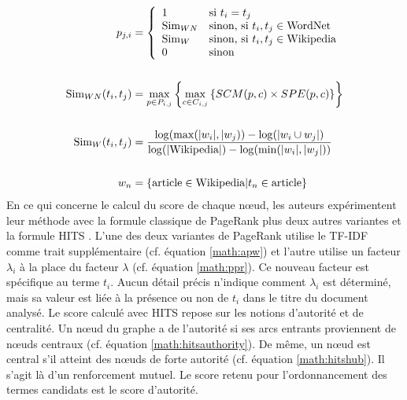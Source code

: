         \begin{align}
          p_{j, i} &= \left\{\begin{array}{ll}
            1 & \text{si $t_i = t_j$}\\
            \text{Sim}_{WN} & \text{sinon, si $t_i, t_j \in \text{WordNet}$}\\
             \text{Sim}_{W} &  \text{sinon, si $t_i, t_j \in \text{Wikipedia}$}\\
            0 & \text{sinon}
          \end{array}\right. \label{math:semanticrank}\\
          \notag\\
          \text{Sim}_{WN}(t_i, t_j) &= \max_{p \in P_{i, j}}\left\{\max_{c \in C_{i, j}}\left\{SCM(p, c) \times SPE(p, c)\right\}\right\} \label{math:wordnetsemanticrelatedness}\\
          \notag\\
          \text{Sim}_{W}(t_i, t_j) &= \frac{\log(\max(|w_i|, |w_j)) - \log(|w_i \cup w_j|)}{\log(|\text{Wikipedia}|) - \log(\min(|w_i|, |w_j|))} \label{math:wikipediasemanticrelatedness}\\
          \notag\\
          w_n &= \left\{\text{article} \in \text{Wikipedia} | t_n \in \text{article}\right\} \notag
        \end{align}
        En ce qui concerne le calcul du score de chaque n\oe{}ud, les auteurs
        expérimentent leur méthode avec la formule classique de PageRank
        \citep{brin1998pagerank} plus deux autres variantes et la formule HITS
        \citep{kleinberg1999hits}. L'une des deux variantes de PageRank utilise le
        TF-IDF comme trait supplémentaire (cf. équation \ref{math:apw}) et l'autre
        utilise un facteur $\lambda_i$ à la place du facteur $\lambda$ (cf.
        équation \ref{math:ppr}). Ce nouveau facteur est spécifique au terme
        $t_i$. Aucun détail précis n'indique comment $\lambda_i$ est déterminé,
        mais sa valeur est liée à la présence ou non de $t_i$ dans le titre du
        document analysé. Le score calculé avec HITS repose sur les notions
        d'autorité et de centralité. Un n\oe{}ud du graphe a de l'autorité si ses
        arcs entrants proviennent de n\oe{}uds centraux (cf. équation
        \ref{math:hitsauthority}). De même, un n\oe{}ud est central s'il atteint
        des n\oe{}uds de forte autorité (cf. équation \ref{math:hitshub}). Il
        s'agit là d'un renforcement mutuel. Le score retenu pour l'ordonnancement
        des termes candidats est le score d'autorité.
